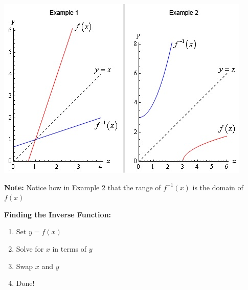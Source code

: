 \documentclass[12pt]{article}
\begin{document}
\includegraphics{InverseGraph.jpg}

\textbf{Note:} Notice how in Example 2 that the range of $f^{-1}(x)$ is the domain of $f(x)$

\textbf{Finding the Inverse Function:}

\begin{enumerate}
\item Set $y = f(x)$
\item Solve for $x$ in terms of $y$
\item Swap $x$ and $y$
\item Done!
\end{enumerate}
\end{document}
